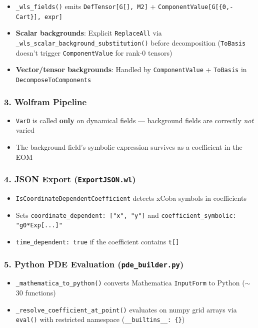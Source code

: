 \begin{itemize}
  \item \texttt{\_wls\_fields()} emits \texttt{DefTensor[G[], M2]} + \texttt{ComponentValue[G[\{0,-Cart\}], expr]}
  \item \textbf{Scalar backgrounds}: Explicit \texttt{ReplaceAll} via \texttt{\_wls\_scalar\_background\_substitution()} before decomposition (\texttt{ToBasis} doesn't trigger \texttt{ComponentValue} for rank-0 tensors)
  \item \textbf{Vector/tensor backgrounds}: Handled by \texttt{ComponentValue} + \texttt{ToBasis} in \texttt{DecomposeToComponents}
\end{itemize}

\subsubsection{3. Wolfram Pipeline}
\label{sec:bg-wolfram}

\begin{itemize}
  \item \texttt{VarD} is called \textbf{only} on dynamical fields --- background fields are correctly \emph{not} varied
  \item The background field's symbolic expression survives as a coefficient in the EOM
\end{itemize}

\subsubsection{4. JSON Export (\texttt{ExportJSON.wl})}
\label{sec:bg-json-export}

\begin{itemize}
  \item \texttt{IsCoordinateDependentCoefficient} detects xCoba symbols in coefficients
  \item Sets \texttt{coordinate\_dependent: ["x", "y"]} and \texttt{coefficient\_symbolic: "g0*Exp[...]"}
  \item \texttt{time\_dependent: true} if the coefficient contains \texttt{t[]}
\end{itemize}

\subsubsection{5. Python PDE Evaluation (\texttt{pde\_builder.py})}
\label{sec:bg-pde-eval}

\begin{itemize}
  \item \texttt{\_mathematica\_to\_python()} converts Mathematica \texttt{InputForm} to Python ($\sim$30 functions)
  \item \texttt{\_resolve\_coefficient\_at\_point()} evaluates on numpy grid arrays via \texttt{eval()} with restricted namespace (\texttt{\_\_builtins\_\_: \{\}})
\end{itemize}

